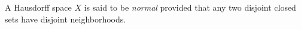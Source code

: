 A Hausdorff space $X$ is said to be \emph{normal} provided that any two disjoint closed sets have disjoint neighborhoods.

